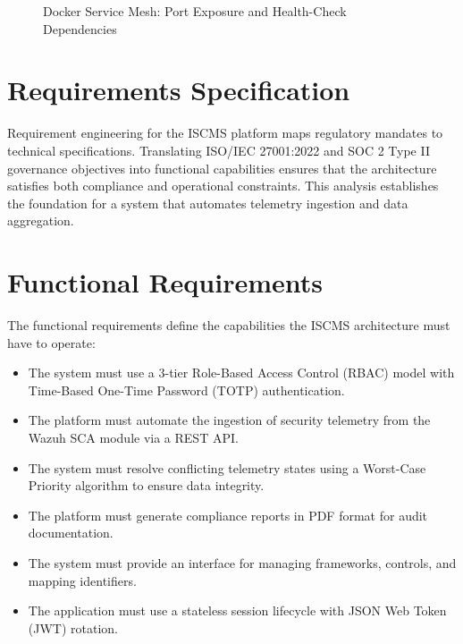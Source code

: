 \begin{figure}[H]
{
    }
    \caption{Docker Service Mesh: Port Exposure and Health-Check Dependencies}
    \label{fig:docker_mesh}
\end{figure}

\section{Requirements Specification}
Requirement engineering for the ISCMS platform maps regulatory mandates to technical specifications. Translating ISO/IEC 27001:2022 and SOC 2 Type II governance objectives into functional capabilities ensures that the architecture satisfies both compliance and operational constraints. This analysis establishes the foundation for a system that automates telemetry ingestion and data aggregation.

\section{Functional Requirements}
The functional requirements define the capabilities the ISCMS architecture must have to operate:

\begin{itemize}
    \item The system must use a 3-tier Role-Based Access Control (RBAC) model with Time-Based One-Time Password (TOTP) authentication.
    \item The platform must automate the ingestion of security telemetry from the Wazuh SCA module via a REST API.
    \item The system must resolve conflicting telemetry states using a Worst-Case Priority algorithm to ensure data integrity.
    \item The platform must generate compliance reports in PDF format for audit documentation.
    \item The system must provide an interface for managing frameworks, controls, and mapping identifiers.
    \item The application must use a stateless session lifecycle with JSON Web Token (JWT) rotation.
\end{itemize}

